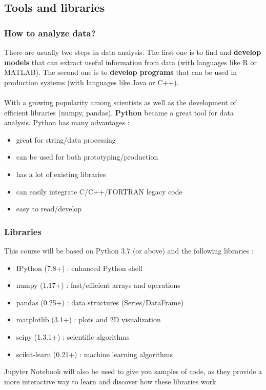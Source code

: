 \documentclass{beamer}
\begin{document}
\subsection{Tools and libraries}
\begin{frame}
  \frametitle{How to analyze data?}
  There are usually two steps in data analysis. The first one is to find and
  \textbf{develop models} that can extract useful information from data (with
  languages like R or MATLAB). The second one is to \textbf{develop programs}
  that can be used in production systems (with languages like Java or C++).
  \\~\\

  With a growing popularity among scientists as well as the development of
  efficient libraries (numpy, pandas), \textbf{Python} became a great tool for
  data analysis. Python has many advantages :
  \begin{itemize}
    \item great for string/data processing
    \item can be used for both prototyping/production
    \item has a lot of existing libraries
    \item can easily integrate C/C++/FORTRAN legacy code
    \item easy to read/develop
  \end{itemize}
\end{frame}

\begin{frame}
  \frametitle{Libraries}
  This course will be based on Python 3.7 (or above) and the following
  libraries :
  \begin{itemize}
    \item IPython (7.8+) : enhanced Python shell
    \item numpy (1.17+) : fast/efficient arrays and operations
    \item pandas (0.25+) : data structures (Series/DataFrame)
    \item matplotlib (3.1+) : plots and 2D visualization
    \item scipy (1.3.1+) : scientific algorithms
    \item scikit-learn (0.21+) : machine learning algorithms
  \end{itemize}

  Jupyter Notebook will also be used to give you samples of code, as they
  provide a more interactive way to learn and discover how these libraries
  work.
\end{frame}
\end{document}
